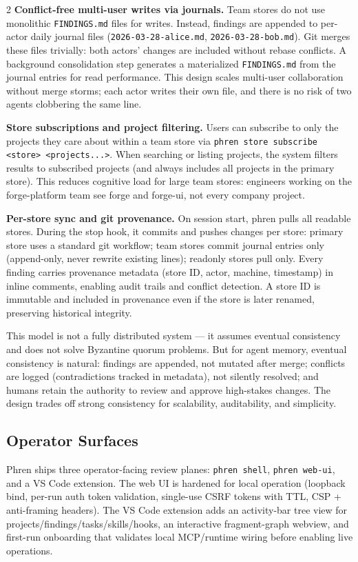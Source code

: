\documentclass[10pt]{article}
\begin{document}
\begin{multicols}{2}
\textbf{Conflict-free multi-user writes via journals.} Team stores do not use monolithic \texttt{FINDINGS.md} files for writes. Instead, findings are appended to per-actor daily journal files (\texttt{2026-03-28-alice.md}, \texttt{2026-03-28-bob.md}). Git merges these files trivially: both actors' changes are included without rebase conflicts. A background consolidation step generates a materialized \texttt{FINDINGS.md} from the journal entries for read performance. This design scales multi-user collaboration without merge storms; each actor writes their own file, and there is no risk of two agents clobbering the same line.

\textbf{Store subscriptions and project filtering.} Users can subscribe to only the projects they care about within a team store via \texttt{phren store subscribe <store> <projects...>}. When searching or listing projects, the system filters results to subscribed projects (and always includes all projects in the primary store). This reduces cognitive load for large team stores: engineers working on the forge-platform team see forge and forge-ui, not every company project.

\textbf{Per-store sync and git provenance.} On session start, phren pulls all readable stores. During the stop hook, it commits and pushes changes per store: primary store uses a standard git workflow; team stores commit journal entries only (append-only, never rewrite existing lines); readonly stores pull only. Every finding carries provenance metadata (store ID, actor, machine, timestamp) in inline comments, enabling audit trails and conflict detection. A store ID is immutable and included in provenance even if the store is later renamed, preserving historical integrity.

This model is not a fully distributed system — it assumes eventual consistency and does not solve Byzantine quorum problems. But for agent memory, eventual consistency is natural: findings are appended, not mutated after merge; conflicts are logged (contradictions tracked in metadata), not silently resolved; and humans retain the authority to review and approve high-stakes changes. The design trades off strong consistency for scalability, auditability, and simplicity.

\subsection{Operator Surfaces}
Phren ships three operator-facing review planes: \texttt{phren shell}, \texttt{phren web-ui}, and a VS Code extension. The web UI is hardened for local operation (loopback bind, per-run auth token validation, single-use CSRF tokens with TTL, CSP + anti-framing headers). The VS Code extension adds an activity-bar tree view for projects/findings/tasks/skills/hooks, an interactive fragment-graph webview, and first-run onboarding that validates local MCP/runtime wiring before enabling live operations.


\end{multicols}
\end{document}
